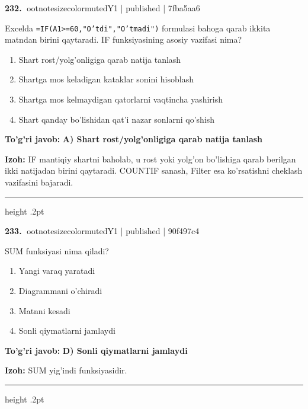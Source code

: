 \documentclass[10pt,a4paper]{article}
\begin{document}
\textbf{\color{ink}232.} {ootnotesizecolor{muted}Y1 | published | 7fba5aa6}
\par
Excelda \texttt{=IF(A1\textgreater{}=60,"O'tdi","O'tmadi")} formulasi bahoga qarab ikkita matndan birini qaytaradi. IF funksiyasining asosiy vazifasi nima?
\begin{enumerate}[label=\Alph*),leftmargin=9mm]
\item Shart rost/yolg'onligiga qarab natija tanlash
\item Shartga mos keladigan kataklar sonini hisoblash
\item Shartga mos kelmaydigan qatorlarni vaqtincha yashirish
\item Shart qanday bo'lishidan qat'i nazar sonlarni qo'shish
\end{enumerate}
\begin{tcolorbox}[enhanced,breakable,colback=teal!4,colframe=teal!55!black,boxrule=0.45pt,arc=1.2mm,left=2.8mm,right=2.8mm,top=2mm,bottom=2mm]
\textbf{\color{teal}To'g'ri javob:} \textbf{A) Shart rost/yolg'onligiga qarab natija tanlash}
\par\smallskip
\textbf{Izoh:} IF mantiqiy shartni baholab, u rost yoki yolg'on bo'lishiga qarab berilgan ikki natijadan birini qaytaradi. COUNTIF sanash, Filter esa ko'rsatishni cheklash vazifasini bajaradi.
\end{tcolorbox}
\vspace{2mm}\hrule height .2pt\vspace{2mm}

\textbf{\color{ink}233.} {ootnotesizecolor{muted}Y1 | published | 90f497c4}
\par
SUM funksiyasi nima qiladi?
\begin{enumerate}[label=\Alph*),leftmargin=9mm]
\item Yangi varaq yaratadi
\item Diagrammani o'chiradi
\item Matnni kesadi
\item Sonli qiymatlarni jamlaydi
\end{enumerate}
\begin{tcolorbox}[enhanced,breakable,colback=teal!4,colframe=teal!55!black,boxrule=0.45pt,arc=1.2mm,left=2.8mm,right=2.8mm,top=2mm,bottom=2mm]
\textbf{\color{teal}To'g'ri javob:} \textbf{D) Sonli qiymatlarni jamlaydi}
\par\smallskip
\textbf{Izoh:} SUM yig'indi funksiyasidir.
\end{tcolorbox}
\vspace{2mm}\hrule height .2pt\vspace{2mm}
\end{document}
